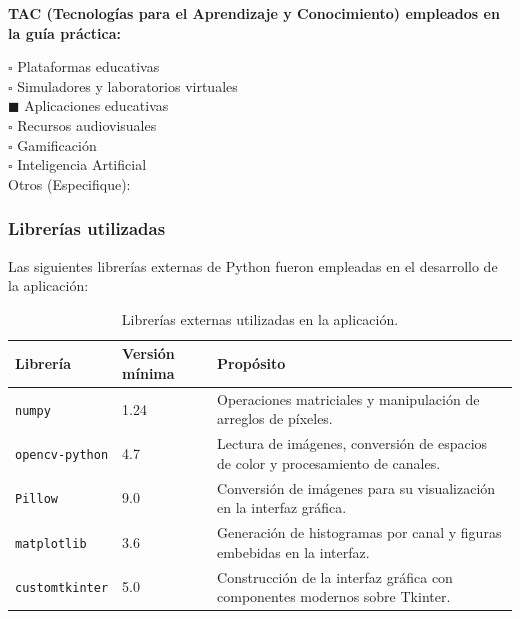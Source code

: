 \documentclass[11pt]{article}
\begin{document}
\textbf{TAC (Tecnologías para el Aprendizaje y Conocimiento) empleados en la guía práctica:}

$\square$ Plataformas educativas \\
$\square$ Simuladores y laboratorios virtuales \\
$\blacksquare$ Aplicaciones educativas \\
$\square$ Recursos audiovisuales \\
$\square$ Gamificación \\
$\square$ Inteligencia Artificial \\
Otros (Especifique): \underline{\hspace{5cm}}

\subsubsection{Librerías utilizadas}
Las siguientes librerías externas de Python fueron empleadas en el desarrollo de la aplicación:

\begin{table}[H]
    \centering
    \begin{tabular}{|l|l|p{7cm}|}
        \hline
        \textbf{Librería}      & \textbf{Versión mínima} & \textbf{Propósito}                                                               \\
        \hline
        \texttt{numpy}         & 1.24                    & Operaciones matriciales y manipulación de arreglos de píxeles.                   \\
        \hline
        \texttt{opencv-python} & 4.7                     & Lectura de imágenes, conversión de espacios de color y procesamiento de canales. \\
        \hline
        \texttt{Pillow}        & 9.0                     & Conversión de imágenes para su visualización en la interfaz gráfica.             \\
        \hline
        \texttt{matplotlib}    & 3.6                     & Generación de histogramas por canal y figuras embebidas en la interfaz.          \\
        \hline
        \texttt{customtkinter} & 5.0                     & Construcción de la interfaz gráfica con componentes modernos sobre Tkinter.      \\
        \hline
    \end{tabular}
    \caption{Librerías externas utilizadas en la aplicación.}
\end{table}
\end{document}
